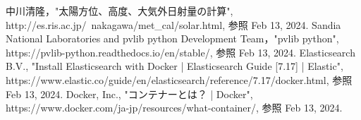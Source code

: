 \begin{thebibliography}{99}

中川清隆，"太陽方位、高度、大気外日射量の計算",\\ http://es.ris.ac.jp/~nakagawa/met\_cal/solar.html, 参照 Feb 13, 2024.
Sandia National Laboratories and pvlib python Development Team，"pvlib python",\\ https://pvlib-python.readthedocs.io/en/stable/, 参照 Feb 13, 2024.
Elasticsearch B.V., "Install Elasticsearch with Docker | Elasticsearch Guide [7.17] | Elastic",\\ https://www.elastic.co/guide/en/elasticsearch/reference/7.17/docker.html, 参照 Feb 13, 2024.
Docker, Inc., "コンテナーとは？ | Docker",\\ https://www.docker.com/ja-jp/resources/what-container/, 参照 Feb 13, 2024.
\end{thebibliography}
